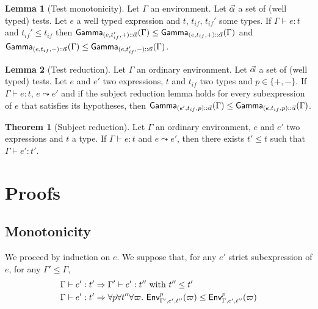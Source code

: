 \documentclass[a4paper]{article}
\theoremstyle{definition}
\newtheorem{theorem}{Theorem}
\newtheorem{lemma}{Lemma}
\begin{document}
        \begin{lemma}[Test monotonicity]
          Let $\Gamma$ an environment. Let $\vec \alpha$ a set of (well typed) tests. Let $e$ a well typed expression and $t$, $t_{if}$, $t_{if}'$ some types.
          If $\Gamma \vdash e : t$ and $t_{if}' \leq t_{if}$ then $\textsf{Gamma}_{{(e,t_{if}',+)}\textsf{::}{\vec \alpha}}(\Gamma) \leq \textsf{Gamma}_{{(e,t_{if},+)}\textsf{::}{\vec \alpha}}(\Gamma)$
          and $\textsf{Gamma}_{{(e,t_{if},-)}\textsf{::}{\vec \alpha}}(\Gamma) \leq \textsf{Gamma}_{{(e,t_{if}',-)}\textsf{::}{\vec \alpha}}(\Gamma)$.
        \end{lemma}
    
        \begin{lemma}[Test reduction]
          Let $\Gamma$ an ordinary environment. Let $\vec \alpha$ a set of (well typed) tests. Let $e$ and $e'$ two expressions, $t$ and $t_{if}$ two types and $p \in \{+,-\}$.
          If $\Gamma \vdash e : t$, $e \leadsto e'$ and if the subject reduction lemma holds for every subexpression of $e$ that satisfies its hypotheses,
          then $\textsf{Gamma}_{{(e',t_{if},p)}\textsf{::}{\vec \alpha}}(\Gamma) \leq \textsf{Gamma}_{{(e,t_{if},p)}\textsf{::}{\vec \alpha}}(\Gamma)$.
        \end{lemma}
    
        \begin{theorem}[Subject reduction]
          Let $\Gamma$ an ordinary environment, $e$ and $e'$ two expressions and $t$ a type.
          If $\Gamma \vdash e : t$ and $e \leadsto e'$, then there exists $t' \leq t$ such that $\Gamma \vdash e' : t'$.
        \end{theorem}
    
        \section{Proofs}
    
        \subsection{Monotonicity}
    
        We proceed by induction on $e$. We suppose that, for any $e'$ strict subexpression of $e$, for any $\Gamma' \leq \Gamma$,
        \begin{align*}
          &\Gamma \vdash e':t' \Rightarrow \Gamma' \vdash e':t'' \text{ with } t'' \leq t'\\
          &\Gamma \vdash e':t' \Rightarrow \forall p \forall t'' \forall \varpi.\ \textsf{Env}^{p}_{\Gamma',e',t''} (\varpi) \leq \textsf{Env}^{p}_{\Gamma,e',t''} (\varpi)
        \end{align*}
    
\end{document}
